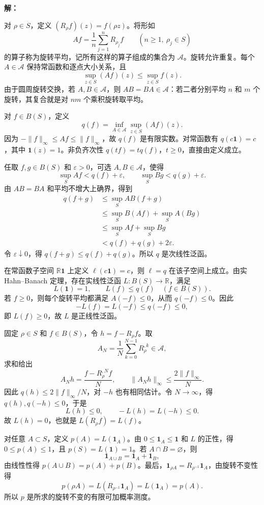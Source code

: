 \documentclass{article}
\begin{document}
\textbf{解：}


对 $\rho\in S$，定义 $(R_\rho f)(z)=f(\rho z)$。将形如
\[
Af=\frac1n\sum_{j=1}^n R_{\rho_j}f
\qquad(n\ge1,\ \rho_j\in S)
\]
的算子称为旋转平均，记所有这样的算子组成的集合为 $\mathcal A$。旋转允许重复。每个 $A\in\mathcal A$ 保持常函数和逐点大小关系，且
\[
\sup_{z\in S}(Af)(z)\le\sup_{z\in S}f(z).
\]
由于圆周旋转交换，若 $A,B\in\mathcal A$，则 $AB=BA\in\mathcal A$：若二者分别平均 $n$ 和 $m$ 个旋转，其复合就是对 $nm$ 个乘积旋转取平均。

对 $f\in B(S)$，定义
\[
q(f)=\inf_{A\in\mathcal A}\sup_{z\in S}(Af)(z).
\]
因为 $-\|f\|_\infty\le Af\le\|f\|_\infty$，故 $q(f)$ 是有限实数。对常函数有 $q(c\mathbf1)=c$，其中 $\mathbf1(z)=1$。非负齐次性 $q(tf)=tq(f)$，$t\ge0$，直接由定义成立。

任取 $f,g\in B(S)$ 和 $\varepsilon>0$，可选 $A,B\in\mathcal A$，使得
\[
\sup_S Af<q(f)+\varepsilon,\qquad
\sup_S Bg<q(g)+\varepsilon.
\]
由 $AB=BA$ 和平均不增大上确界，得到
\[
\begin{aligned}
q(f+g)&\le\sup_S AB(f+g)\\
&\le\sup_S B(Af)+\sup_S A(Bg)\\
&\le\sup_S Af+\sup_S Bg\\
&<q(f)+q(g)+2\varepsilon.
\end{aligned}
\]
令 $\varepsilon\downarrow0$，得 $q(f+g)\le q(f)+q(g)$。所以 $q$ 是次线性泛函。

在常函数子空间 $\mathbb R\mathbf1$ 上定义 $\ell(c\mathbf1)=c$，则 $\ell=q$ 在该子空间上成立。由实 Hahn--Banach 定理，存在实线性泛函 $L:B(S)\to\mathbb R$，满足
\[
L(\mathbf1)=1,\qquad L(f)\le q(f)\quad(f\in B(S)).
\]
若 $f\ge0$，则每个旋转平均都满足 $A(-f)\le0$，从而 $q(-f)\le0$。因此
\[
-L(f)=L(-f)\le q(-f)\le0,
\]
即 $L(f)\ge0$，故 $L$ 是正线性泛函。

固定 $\rho\in S$ 和 $f\in B(S)$，令 $h=f-R_\rho f$。取
\[
A_N=\frac1N\sum_{k=0}^{N-1}R_\rho^{,k}\in\mathcal A,
\]
求和给出
\[
A_Nh=\frac{f-R_\rho^{,N}f}{N},\qquad
\|A_Nh\|_\infty\le\frac{2\|f\|_\infty}{N}.
\]
因此 $q(h)\le2\|f\|_\infty/N$，对 $-h$ 也有相同估计。令 $N\to\infty$，得 $q(h),q(-h)\le0$，于是
\[
L(h)\le0,\qquad -L(h)=L(-h)\le0.
\]
故 $L(h)=0$，也就是 $L(R_\rho f)=L(f)$。

对任意 $A\subset S$，定义 $p(A)=L(\mathbf1_A)$。由 $0\le\mathbf1_A\le\mathbf1$ 和 $L$ 的正性，得 $0\le p(A)\le1$，且 $p(S)=L(\mathbf1)=1$。若 $A\cap B=\varnothing$，则
\[
\mathbf1_{A\cup B}=\mathbf1_A+\mathbf1_B,
\]
由线性性得 $p(A\cup B)=p(A)+p(B)$。最后，$\mathbf1_{\rho A}=R_{\rho^{-1}}\mathbf1_A$，由旋转不变性得
\[
p(\rho A)=L(R_{\rho^{-1}}\mathbf1_A)=L(\mathbf1_A)=p(A).
\]
所以 $p$ 是所求的旋转不变的有限可加概率测度。
\end{document}
